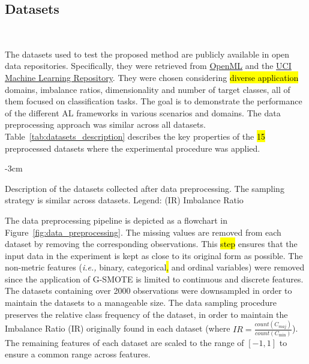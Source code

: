 \documentclass[preprint, 12pt]{elsarticle}
\begin{document}
\subsection{Datasets}~\label{sec:datasets}

The datasets used to test the proposed method are publicly available in open
data repositories. Specifically, they were retrieved from
\href{https://www.openml.org/}{OpenML} and the
\href{https://archive.ics.uci.edu/}{UCI Machine Learning Repository}. They
were chosen considering \hl{diverse application} domains, imbalance ratios,
dimensionality and number of target classes, all of them focused on
classification tasks. The goal is to demonstrate the performance of the
different AL frameworks in various scenarios and domains. The data
preprocessing approach was similar across all datasets.
Table~\ref{tab:datasets_description} describes the key properties of the
\hl{15} preprocessed datasets where the experimental procedure was applied. 
 
\begin{table}[H]
    \centering
    \addtolength{\leftskip} {-3cm}
    \addtolength{\rightskip}{-3cm}
    \caption{\label{tab:datasets_description}
        Description of the datasets collected after data preprocessing. The
        sampling strategy is similar across datasets. Legend: (IR) Imbalance
        Ratio
    }
\end{table}

The data preprocessing pipeline is depicted as a flowchart in
Figure~\ref{fig:data_preprocessing}. The missing values are removed from each
dataset by removing the corresponding observations. This \hl{step} ensures
that the input data in the experiment is kept as close to its original form as
possible. The non-metric features (\textit{i.e.,} binary, categorical\hl{,}
and ordinal variables) were removed since the application of G-SMOTE is
limited to continuous and discrete features. The datasets containing over 2000
observations were downsampled in order to maintain the datasets to a
manageable size. The data sampling procedure preserves the relative class
frequency of the dataset, in order to maintain the Imbalance Ratio (IR)
originally found in each dataset (where $IR =
\frac{count(C_{maj})}{count(C_{\min})}$). The remaining features of each
dataset are scaled to the range of $[-1, 1]$ to ensure a common range across
features.
\end{document}
